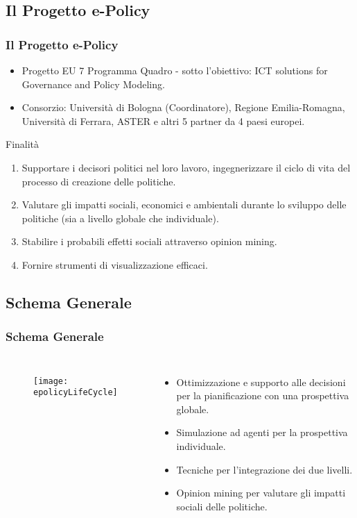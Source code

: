 \documentclass{beamer}
\begin{document}
\subsection{Il Progetto e-Policy}
	\begin{frame}
		\frametitle{Il Progetto e-Policy}
		\begin{itemize}
		\item Progetto EU 7 Programma Quadro - sotto l'obiettivo: ICT solutions for Governance and Policy Modeling.
		\item Consorzio: Università di Bologna (Coordinatore), Regione Emilia-Romagna, Università di Ferrara, ASTER e altri 5 partner da 4 paesi europei.
		\end{itemize}
		\begin{block}{Finalità}
			\begin{enumerate}
			\item Supportare i decisori politici nel loro lavoro, ingegnerizzare il ciclo di vita del processo di creazione delle politiche.
			\item Valutare gli impatti sociali, economici e ambientali durante lo sviluppo delle politiche (sia a livello globale che individuale).
			\item Stabilire i probabili effetti sociali attraverso opinion mining.
			\item Fornire strumenti di visualizzazione efficaci.
			\end{enumerate}
		\end{block}
 	\end{frame}
 	
\subsection{Schema Generale}
	\begin{frame}
		\frametitle{Schema Generale}
		\begin{columns}
		\column{.57\textwidth}
			\begin{figure}[hbt]
				\centering
				\texttt{[image: epolicyLifeCycle]}
				\label{epolicyLifeCycle}
			\end{figure}
		\column{.43\textwidth}
		\begin{itemize}
			\item Ottimizzazione e supporto alle decisioni per la pianificazione con una prospettiva globale.
			\item Simulazione ad agenti per la prospettiva individuale.
			\item Tecniche per l'integrazione dei due livelli.
			\item Opinion mining per valutare gli impatti sociali delle politiche.
		\end{itemize}
		\end{columns}
	\end{frame}
	
\end{document}
